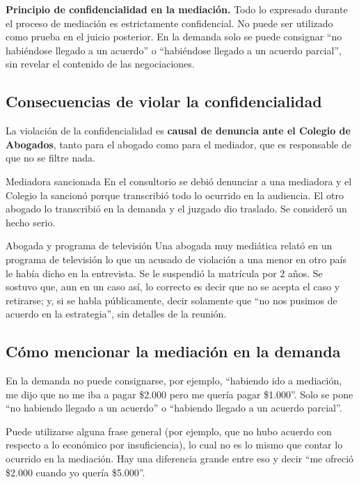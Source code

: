 \documentclass[12pt,oneside]{book}
\begin{document}
\begin{important}
\textbf{Principio de confidencialidad en la mediación.} Todo lo expresado durante el proceso de mediación es estrictamente confidencial. No puede ser utilizado como prueba en el juicio posterior. En la demanda solo se puede consignar ``no habiéndose llegado a un acuerdo'' o ``habiéndose llegado a un acuerdo parcial'', sin revelar el contenido de las negociaciones.
\end{important}

\subsection{Consecuencias de violar la confidencialidad}

La violación de la confidencialidad es \textbf{causal de denuncia ante el Colegio de Abogados}, tanto para el abogado como para el mediador, que es responsable de que no se filtre nada.

\begin{example}{Mediadora sancionada}
En el consultorio se debió denunciar a una mediadora y el Colegio la sancionó porque transcribió todo lo ocurrido en la audiencia. El otro abogado lo transcribió en la demanda y el juzgado dio traslado. Se consideró un hecho serio.
\end{example}

\begin{example}{Abogada y programa de televisión}
Una abogada muy mediática relató en un programa de televisión lo que un acusado de violación a una menor en otro país le había dicho en la entrevista. Se le suspendió la matrícula por 2 años. Se sostuvo que, aun en un caso así, lo correcto es decir que no se acepta el caso y retirarse; y, si se habla públicamente, decir solamente que ``no nos pusimos de acuerdo en la estrategia'', sin detalles de la reunión.
\end{example}

\subsection{Cómo mencionar la mediación en la demanda}

En la demanda no puede consignarse, por ejemplo, ``habiendo ido a mediación, me dijo que no me iba a pagar \$2.000 pero me quería pagar \$1.000''. Solo se pone ``no habiendo llegado a un acuerdo'' o ``habiendo llegado a un acuerdo parcial''.

Puede utilizarse alguna frase general (por ejemplo, que no hubo acuerdo con respecto a lo económico por insuficiencia), lo cual no es lo mismo que contar lo ocurrido en la mediación. Hay una diferencia grande entre eso y decir ``me ofreció \$2.000 cuando yo quería \$5.000''.
\end{document}

